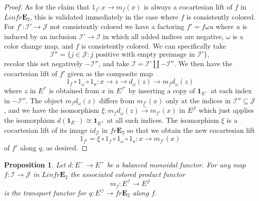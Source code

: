 \documentclass[reqno]{amsart}
\newtheorem{proposition}[lemma]{Proposition}
\theoremstyle{definition}
\newcommand{\mcl}[1]{\mathcal{#1}}
\newcommand{\E}{\mathbf{E}}
\renewcommand{\1}{\mathbf{1}}
\begin{document}
\begin{proof}
As for the claim that $1_{f}:x\to m_f(x)$ is always a cocartesian lift of $f$ in $Linfr\E_2$, this is validated immediately in the case where $f$ is consistently colored.  For $f':\mcl{I}'\to \mcl{J}$ not consistently colored we have a factoring $f'=f\omega u$ where $u$ is induced by an inclusion $\mcl{I}'\to \mcl{I}$ in which all added indices are negative, $\omega$ is a color change map, and $f$ is consistently colored.   We can specifically take
\[
\mcl{I}''=\{j\in \mcl{J}:j\text{ positive with empty preimage in }\mcl{I}'\},
\]
recolor this set negatively $-\mcl{I}''$, and take $\mcl{I}=\mcl{I}'\amalg -\mcl{I}''$.  We then have the cocartesian lift of $f'$ given as the composite map
\[
1_f\circ 1_{\omega}\circ 1_u:x\to z\to d_{\omega}(z)\to m_fd_{\omega}(z)
\]
where $z$ in $E^{\mcl{I}}$ is obtained from $x$ in $E^{\mcl{I}'}$ by inserting a copy of $\1_{E^-}$ at each index in $-\mcl{I}''$.  The object $m_fd_{\omega}(z)$ differs from $m_{f'}(x)$ only at the indices in $\mcl{I}''\subseteq \mcl{J}$, and we have the isomorphism $\xi:m_fd_{\omega}(z)\overset{\sim}\to m_{f'}(x)$ in $E^{\mcl{J}}$ which just applies the isomorphism $d(\1_{E^-})\cong \1_{E^+}$ at all such indices.  The isomorphism $\xi$ is a cocartesian lift of its image $id_{\mcl{J}}$ in $fr\E_2$ so that we obtain the new cocartesian lift
\[
1_{f'}=\xi\circ 1_f\circ 1_{\omega}\circ 1_u:x\to m_{f'}(x)
\]
of $f'$ along $q$, as desired. 
\end{proof}

\begin{proposition}\label{prop:balanced2}
Let $d:E^-\to E^+$ be a balanced monoidal functor.  For any map $f:\mcl{I}\to \mcl{J}$ in $Linfr\E_2$ the associated colored product functor
\[
m_f:E^{\mcl{I}}\to E^{\mcl{J}}
\]
is the transport functor for $q:E^{\odot}\to fr\E_2$ along $f$.
\end{proposition}
\end{document}
